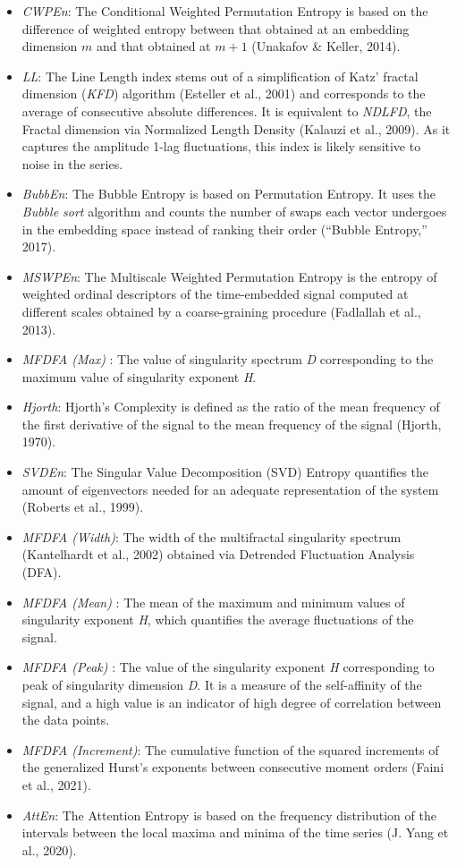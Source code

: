 \documentclass[
  man]{apa6}
\providecommand{\tightlist}{%
  \setlength{\itemsep}{0pt}\setlength{\parskip}{0pt}}
\begin{document}
\begin{itemize}
\tightlist
\item
  \emph{CWPEn}: The Conditional Weighted Permutation Entropy is based on the difference of weighted entropy between that obtained at an embedding dimension \(m\) and that obtained at \(m+1\) (Unakafov \& Keller, 2014).
\item
  \emph{LL}: The Line Length index stems out of a simplification of Katz' fractal dimension (\emph{KFD}) algorithm (Esteller et al., 2001) and corresponds to the average of consecutive absolute differences. It is equivalent to \emph{NDLFD}, the Fractal dimension via Normalized Length Density (Kalauzi et al., 2009). As it captures the amplitude 1-lag fluctuations, this index is likely sensitive to noise in the series.
\item
  \emph{BubbEn}: The Bubble Entropy is based on Permutation Entropy. It uses the \emph{Bubble sort} algorithm and counts the number of swaps each vector undergoes in the embedding space instead of ranking their order ({``Bubble Entropy,''} 2017).
\item
  \emph{MSWPEn}: The Multiscale Weighted Permutation Entropy is the entropy of weighted ordinal descriptors of the time-embedded signal computed at different scales obtained by a coarse-graining procedure (Fadlallah et al., 2013).
\item
  \emph{MFDFA (Max)} : The value of singularity spectrum \emph{D} corresponding to the maximum value of singularity exponent \emph{H}.
\item
  \emph{Hjorth}: Hjorth's Complexity is defined as the ratio of the mean frequency of the first derivative of the signal to the mean frequency of the signal (Hjorth, 1970).
\item
  \emph{SVDEn}: The Singular Value Decomposition (SVD) Entropy quantifies the amount of eigenvectors needed for an adequate representation of the system (Roberts et al., 1999).
\item
  \emph{MFDFA (Width)}: The width of the multifractal singularity spectrum (Kantelhardt et al., 2002) obtained via Detrended Fluctuation Analysis (DFA).
\item
  \emph{MFDFA (Mean)} : The mean of the maximum and minimum values of singularity exponent \emph{H}, which quantifies the average fluctuations of the signal.
\item
  \emph{MFDFA (Peak)} : The value of the singularity exponent \emph{H} corresponding to peak of singularity dimension \emph{D}. It is a measure of the self-affinity of the signal, and a high value is an indicator of high degree of correlation between the data points.
\item
  \emph{MFDFA (Increment)}: The cumulative function of the squared increments of the generalized Hurst's exponents between consecutive moment orders (Faini et al., 2021).
\item
  \emph{AttEn}: The Attention Entropy is based on the frequency distribution of the intervals between the local maxima and minima of the time series (J. Yang et al., 2020).
\end{itemize}
\end{document}
